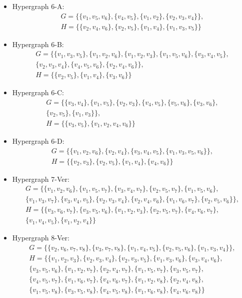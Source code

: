 \begin{itemize}
\item Hypergraph 6-A:
\begin{gather*}
G=\{\{v_1,v_5,v_6\},\{v_4,v_5\},\{v_1,v_2\},\{v_2,v_3,v_4\}\},\\[4pt]
H=\{\{v_2,v_4,v_6\},\{v_2,v_5\},\{v_1,v_4\},\{v_1,v_3,v_5\}\}
\end{gather*}
\item Hypergraph 6-B:
\begin{gather*}
G=\{\{v_1,v_3,v_5\},\{v_1,v_2,v_6\},\{v_1,v_2,v_3\},\{v_1,v_5,v_6\},\{v_3,v_4,v_5\},\\[4pt]
\{v_2,v_3,v_4\},\{v_4,v_5,v_6\},\{v_2,v_4,v_6\}\},\\[4pt]
H=\{\{v_2,v_5\},\{v_1,v_4\},\{v_3,v_6\}\}
\end{gather*}
\item Hypergraph 6-C:
\begin{gather*}
G=\{\{v_3,v_4\},\{v_1,v_5\},\{v_2,v_3\},\{v_4,v_5\},\{v_5,v_6\},\{v_3,v_6\},\\[4pt]
\{v_2,v_5\},\{v_1,v_3\}\},\\[4pt]
H=\{\{v_3,v_5\},\{v_1,v_2,v_4,v_6\}\}
\end{gather*}
\item Hypergraph 6-D:
\begin{gather*}
G=\{\{v_1,v_2,v_6\},\{v_2,v_4\},\{v_3,v_4,v_5\},\{v_1,v_3,v_5,v_6\}\},\\[4pt]
H=\{\{v_2,v_3\},\{v_2,v_5\},\{v_1,v_4\},\{v_4,v_6\}\}
\end{gather*}
\item Hypergraph 7-Ver:
\begin{gather*}
G=\{\{v_1,v_2,v_6\},\{v_1,v_5,v_7\},\{v_3,v_4,v_7\},\{v_2,v_5,v_7\},\{v_1,v_5,v_6\},\\[4pt]
\{v_1,v_3,v_7\},\{v_3,v_4,v_5\},\{v_2,v_3,v_4\},\{v_2,v_4,v_6\},\{v_1,v_6,v_7\},\{v_2,v_5,v_6\}\},\\[4pt]
H=\{\{v_3,v_6,v_7\},\{v_3,v_5,v_6\},\{v_1,v_2,v_3\},\{v_2,v_5,v_7\},\{v_4,v_6,v_7\},\\[4pt]
\{v_1,v_4,v_5\},\{v_1,v_2,v_4\}\}
\end{gather*}
\item Hypergraph 8-Ver:
\begin{gather*}
G=\{\{v_2,v_6,v_7,v_8\},\{v_3,v_7,v_8\},\{v_1,v_4,v_5\},\{v_2,v_5,v_6\},\{v_1,v_3,v_4\}\},\\[4pt]
H=\{\{v_1,v_2,v_3\},\{v_2,v_3,v_4\},\{v_2,v_3,v_5\},\{v_1,v_3,v_6\},\{v_3,v_4,v_6\},\\[4pt]
\{v_3,v_5,v_6\},\{v_1,v_2,v_7\},\{v_2,v_4,v_7\},\{v_1,v_5,v_7\},\{v_3,v_5,v_7\},\\[4pt]
\{v_4,v_5,v_7\},\{v_1,v_6,v_7\},\{v_4,v_6,v_7\},\{v_1,v_2,v_8\},\{v_2,v_4,v_8\},\\[4pt]
\{v_1,v_5,v_8\},\{v_3,v_5,v_8\},\{v_4,v_5,v_8\},\{v_1,v_6,v_8\},\{v_4,v_6,v_8\}\}
\end{gather*}
\end{itemize}

